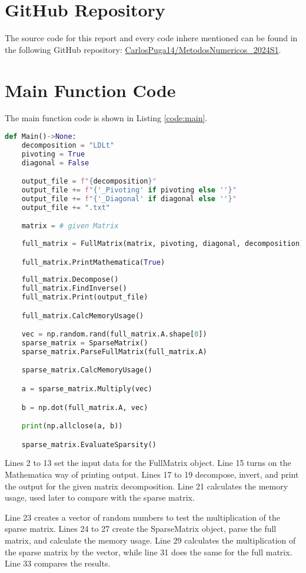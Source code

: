 \section{GitHub Repository}\label{sec:github}
 The source code for this report and every code inhere mentioned can be found in the following GitHub repository: \href{https://github.com/CarlosPuga14/MetodosNumericos_2024S1}{CarlosPuga14/MetodosNumericos\_2024S1}.

\section{Main Function Code} \label{sec:mainFunction}
The main function code is shown in Listing \ref{code:main}.
\begin{lstlisting}[language=Python, caption={Main function.}, label={code:main}]
def Main()->None:
    decomposition = "LDLt"
    pivoting = True
    diagonal = False

    output_file = f"{decomposition}" 
    output_file += f"{'_Pivoting' if pivoting else ''}"
    output_file += f"{'_Diagonal' if diagonal else ''}"
    output_file += ".txt"

    matrix = # given Matrix  
    
    full_matrix = FullMatrix(matrix, pivoting, diagonal, decomposition)

    full_matrix.PrintMathematica(True)
 
    full_matrix.Decompose()
    full_matrix.FindInverse()
    full_matrix.Print(output_file)

    full_matrix.CalcMemoryUsage()

    vec = np.random.rand(full_matrix.A.shape[0])
    sparse_matrix = SparseMatrix()
    sparse_matrix.ParseFullMatrix(full_matrix.A)

    sparse_matrix.CalcMemoryUsage()

    a = sparse_matrix.Multiply(vec)

    b = np.dot(full_matrix.A, vec)

    print(np.allclose(a, b))

    sparse_matrix.EvaluateSparsity()
\end{lstlisting}
Lines 2 to 13 set the input data for the FullMatrix object. Line 15 turns on the Mathematica way of printing output. Lines 17 to 19 decompose, invert, and print the output for the given matrix decomposition. Line 21 calculates the memory usage, used later to compare with the sparse matrix. 

Line 23 creates a vector of random numbers to test the multiplication of the sparse matrix. Lines 24 to 27 create the SparseMatrix object, parse the full matrix, and calculate the memory usage. Line 29 calculates the multiplication of the sparse matrix by the vector, while line 31 does the same for the full matrix. Line 33 compares the results. 


